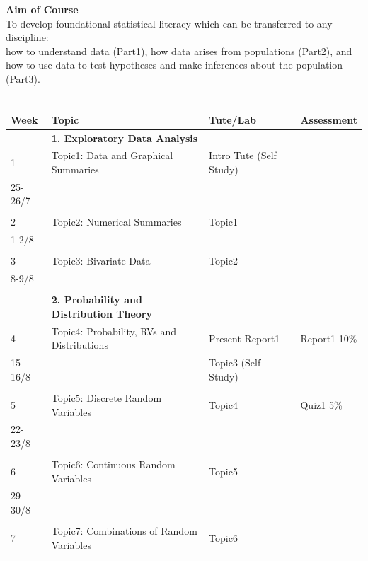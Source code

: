 \documentclass[bigtut]{quiz}\usepackage[]{graphicx}\usepackage[]{color}
\begin{document}

\begin{tutorial}

{\bf Aim of Course}  \\
To develop foundational statistical literacy which can be transferred to any discipline: \\
how to understand data (Part1), how data arises from populations (Part2), and how to use data to test hypotheses and make inferences about the population (Part3).  \\ \\

{\small \begin{tabular}{|l|l|l|l|} \hline
{\bf Week} & {\bf Topic} \hspace{7cm} & {\bf Tute/Lab} \hspace{3cm} & {\bf Assessment} \hspace{.9cm} \\ \hline
  & {\bf 1. Exploratory Data Analysis} &    &  \\ \hline
1  & Topic1: Data and Graphical Summaries &  Intro Tute (Self Study)  &  \\
25-26/7 &  &   & \\
& & & \\ \hline
2 & Topic2: Numerical Summaries & Topic1 & \\
1-2/8  &   &  & \\ 
& & & \\ \hline
3 & Topic3: Bivariate Data & Topic2 & \\
8-9/8 & &   & \\
& & & \\ \hline
 & {\bf 2. Probability and Distribution Theory} & &   \\ \hline
4 & Topic4: Probability, RVs and Distributions &  Present Report1 & Report1 10\% \\
15-16/8 &   & Topic3 (Self Study) &  \\
& & & \\ \hline
5 & Topic5: Discrete Random Variables & Topic4 & Quiz1 5\%  \\
22-23/8 &  &   &  \\ 
& & & \\ \hline
6 & Topic6: Continuous Random Variables & Topic5 & \\
29-30/8 & & & \\ 
& & & \\ \hline
7 & Topic7: Combinations of Random Variables & Topic6 & \\

\end{tabular}}
\end{tutorial}
\end{document}
